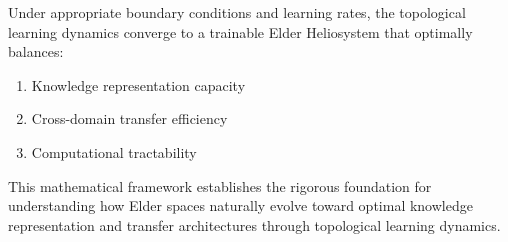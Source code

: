 \begin{corollary}
Under appropriate boundary conditions and learning rates, the topological learning dynamics converge to a trainable Elder Heliosystem that optimally balances:
\begin{enumerate}
    \item Knowledge representation capacity
    \item Cross-domain transfer efficiency  
    \item Computational tractability
\end{enumerate}
\end{corollary}

This mathematical framework establishes the rigorous foundation for understanding how Elder spaces naturally evolve toward optimal knowledge representation and transfer architectures through topological learning dynamics.